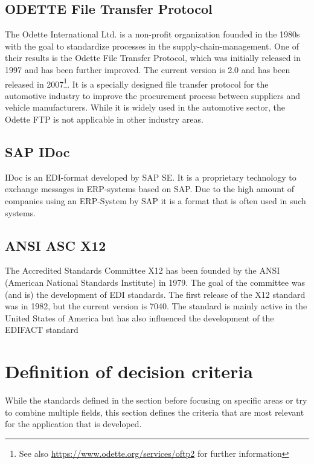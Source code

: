 \subsection{ODETTE File Transfer Protocol}
\label{sec2.1.5}

The Odette International Ltd. is a non-profit organization founded in the 1980s with the goal to standardize processes in the supply-chain-management. One of their results is the Odette File Transfer Protocol, which was initially released in 1997 and has been further improved. The current version is 2.0 and has been released in 2007\footnote{See also \url{https://www.odette.org/services/oftp2} for further information}. It is a specially designed file transfer protocol for the automotive industry to improve the procurement process between suppliers and vehicle manufacturers. While it is widely used in the automotive sector, the Odette FTP is not applicable in other industry areas.

\subsection{SAP IDoc}
\label{sec2.1.6}

IDoc is an EDI-format developed by SAP SE. It is a proprietary technology to exchange messages in ERP-systems based on SAP. Due to the high amount of companies using an ERP-System by SAP it is a format that is often used in such systems.

\subsection{ANSI ASC X12}
\label{sec2.1.7}

The Accredited Standards Committee X12 has been founded by the ANSI (American National Standards Institute) in 1979. The goal of the committee was (and is) the development of EDI standards. The first release of the X12 standard was in 1982, but the current version is 7040. The standard is mainly active in the United States of America but has also influenced the development of the EDIFACT standard

\section{Definition of decision criteria}
\label{sec2.2}

While the standards defined in the section before focusing on specific areas or try to combine multiple fields, this section defines the criteria that are most relevant for the application that is developed.

